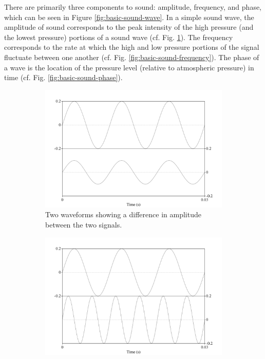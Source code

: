\documentclass[dissertation,copyright]{uathesis}
\begin{document}
There are primarily three components to sound: amplitude, frequency, and phase, which can be seen in Figure \ref{fig:basic-sound-wave}.  In a simple sound wave, the amplitude of sound corresponds to the peak intensity of the high pressure (and the lowest pressure) portions of a sound wave (cf. Fig. \ref{fig:basic-sound-amplitude}).  The frequency corresponds to the rate at which the high and low pressure portions of the signal fluctuate between one another (cf. Fig. \ref{fig:basic-sound-frequency}).  The phase of a wave is the location of the pressure level (relative to atmospheric pressure) in time (cf. Fig. \ref{fig:basic-sound-phase}).   

\begin{figure}[h!]
\begin{subfigure}{0.5\textwidth}
  \includegraphics[width=\textwidth]{figure/basic-sound-amplitude.png}
  \caption{Two waveforms showing a difference in amplitude between the two signals.}
  \label{fig:basic-sound-amplitude}
\end{subfigure}
\qquad
\begin{subfigure}{0.5\textwidth}
  \includegraphics[width=\textwidth]{figure/basic-sound-frequency.png}

\end{subfigure}
\end{figure}
\end{document}
